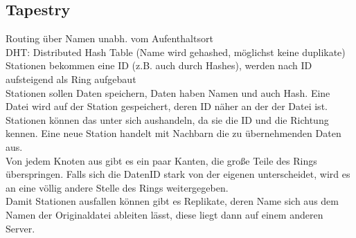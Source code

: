 \documentclass[a4paper]{article}
\begin{document}
\subsection{Tapestry}
Routing über Namen unabh. vom Aufenthaltsort\\
DHT: Distributed Hash Table (Name wird gehashed, möglichst keine duplikate)\\
Stationen bekommen eine ID (z.B. auch durch Hashes), werden nach ID aufsteigend als Ring aufgebaut\\
Stationen sollen Daten speichern, Daten haben Namen und auch Hash. Eine Datei wird auf der Station gespeichert, deren ID näher an der der Datei  ist. Stationen können das unter sich aushandeln, da sie die ID und die Richtung kennen. Eine neue Station handelt mit Nachbarn die zu übernehmenden Daten aus.\\
Von jedem Knoten aus gibt es ein paar Kanten, die große Teile des Rings überspringen. Falls sich die DatenID stark von der eigenen unterscheidet, wird es an eine völlig andere Stelle des Rings weitergegeben.\\
Damit Stationen ausfallen können gibt es Replikate, deren Name sich aus dem Namen der Originaldatei ableiten lässt, diese liegt dann auf einem anderen Server.
\end{document}
